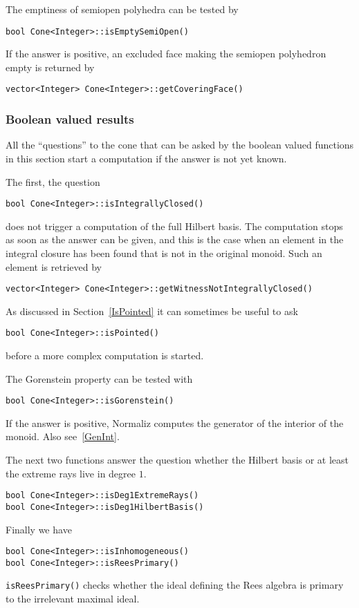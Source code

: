 \begin{small}
The emptiness of semiopen polyhedra can be tested by
\begin{Verbatim}
bool Cone<Integer>::isEmptySemiOpen()
\end{Verbatim}
If the answer is positive, an excluded face making the semiopen polyhedron empty is returned by
\begin{Verbatim}
vector<Integer> Cone<Integer>::getCoveringFace() 
\end{Verbatim}

\subsubsection{Boolean valued results}

All the ``questions'' to the cone that can be asked by the boolean valued functions in this section start a computation if the answer is not yet known.

The first, the question
\begin{Verbatim}
bool Cone<Integer>::isIntegrallyClosed()
\end{Verbatim}
does not trigger a computation of the full Hilbert basis. The computation stops as soon as the answer can be given, and this is the case when an element in the integral closure has been found that is not in the original monoid. Such an element is retrieved by
\begin{Verbatim}
vector<Integer> Cone<Integer>::getWitnessNotIntegrallyClosed()
\end{Verbatim}

As discussed in Section~\ref{IsPointed} it can sometimes be useful to ask
\begin{Verbatim}
bool Cone<Integer>::isPointed()
\end{Verbatim}
before a more complex computation is started.

The Gorenstein property can be tested with
\begin{Verbatim}
bool Cone<Integer>::isGorenstein()
\end{Verbatim}
If the answer is positive, Normaliz computes the generator of the interior of the monoid. Also see~\ref{GenInt}.


The next two functions answer the question whether the Hilbert basis or at least the extreme rays live in degree $1$.
\begin{Verbatim}
bool Cone<Integer>::isDeg1ExtremeRays()
bool Cone<Integer>::isDeg1HilbertBasis()
\end{Verbatim}

Finally we have
\begin{Verbatim}
bool Cone<Integer>::isInhomogeneous()
bool Cone<Integer>::isReesPrimary()
\end{Verbatim}
\verb|isReesPrimary()| checks whether the ideal defining the Rees algebra is primary to the irrelevant maximal ideal.



\end{small}
